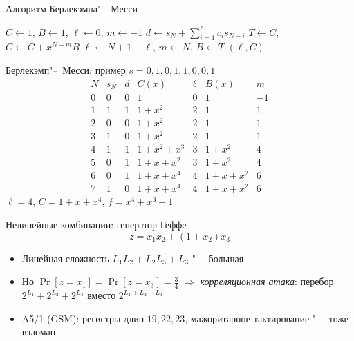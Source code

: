 \documentclass{ca-slides}
\begin{document}
\begin{canvasframe}{Алгоритм Берлекэмпа"--~Месси}
  \begin{algorithmic}[1]
    \State $C \gets 1$, $B \gets 1$, $\ell \gets 0$, $m \gets -1$
      \State $d \gets s_N + \sum_{i=1}^{\ell} c_i s_{N-i}$
        \State $T \gets C$, \quad $C \gets C + x^{N-m} B$
         \State $\ell \gets N + 1 - \ell$, $m \gets N$, $B \gets T$ \EndIf
      \EndIf
    \EndFor
    \State \Return $(\ell, C)$
  \end{algorithmic}
\end{canvasframe}

\begin{canvasframe}{Берлекэмп"--~Месси: пример}
  $s = 0, 1, 0, 1, 1, 0, 0, 1$
  \small
  \[
  \begin{array}{c|c|c|l|c|l|c}
    N & s_N & d & C(x) & \ell & B(x) & m\\ \hline
    0 & 0 & 0 & 1 & 0 & 1 & -1\\
    1 & 1 & 1 & 1 + x^2 & 2 & 1 & 1\\
    2 & 0 & 0 & 1 + x^2 & 2 & 1 & 1\\
    3 & 1 & 0 & 1 + x^2 & 2 & 1 & 1\\
    4 & 1 & 1 & 1 + x^2 + x^3 & 3 & 1 + x^2 & 4\\
    5 & 0 & 1 & 1 + x + x^2 & 3 & 1 + x^2 & 4\\
    6 & 0 & 1 & 1 + x + x^4 & 4 & 1 + x + x^2 & 6\\
    7 & 1 & 0 & 1 + x + x^4 & 4 & 1 + x + x^2 & 6
  \end{array}
  \]
  $\ell = 4$, $C = 1 + x + x^4$, $f = x^4 + x^3 + 1$
\end{canvasframe}

\begin{canvasframe}[shrink=10]{Нелинейные комбинации: генератор Геффе}
  \[z = x_1 x_2 + (1 + x_2) x_3\]
  \begin{itemize}
    \item Линейная сложность $L_1 L_2 + L_2 L_3 + L_3$ "--- большая
    \item Но $\Pr[z = x_1] = \Pr[z = x_3] = \frac34$ $\Rightarrow$ \emph{корреляционная атака}:
      перебор $2^{L_1} + 2^{L_2} + 2^{L_3}$ вместо $2^{L_1 + L_2 + L_3}$
    \item A5/1 (GSM): регистры длин $19, 22, 23$, мажоритарное тактирование "--- тоже взломан
  \end{itemize}
\end{canvasframe}
\end{document}
